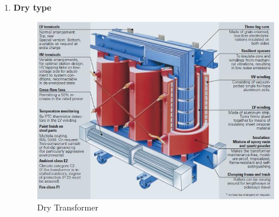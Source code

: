 \documentclass[12pt,fleqn]{book} %
\begin{document}
\begin{enumerate}
\begin{table}[h!]
\end{table}

\item \textbf {Dry type}
     \begin{figure}[h!]
    \centering
    \includegraphics[width=1\linewidth]{hamdy 9.png}
    \caption{Dry Transformer}
    \label{fig:hamdy 9}
\end{figure}


\end{enumerate}
\end{document}
